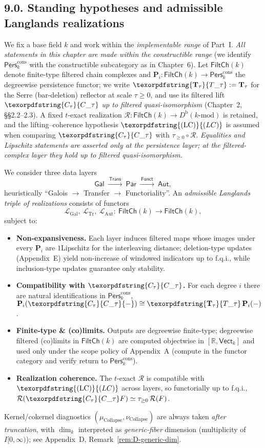 \documentclass[11pt]{article}
\DeclareRobustCommand{\hyp}{\nobreakdash-}
\newcommand{\Pers}{\mathsf{Pers}}
\newcommand{\Rfun}{\mathcal{R}}
\numberwithin{equation}{section}
\theoremstyle{definition}
\DeclareRobustCommand{\FiltCh}[1]{\mathsf{FiltCh}(#1)}
\DeclareRobustCommand{\Perskft}{\Pers^{\mathrm{cons}}_{k}}
\DeclareRobustCommand{\Ttau}{\texorpdfstring{\ensuremath{\mathbf{T}_{\tau}}}{T\_\tau}}
\DeclareRobustCommand{\Ctau}{\texorpdfstring{\ensuremath{C_{\tau}}}{C\_\tau}}
\DeclareRobustCommand{\LC}{\texorpdfstring{\ensuremath{\mathrm{(LC)}}}{(LC)}}
\begin{document}
\subsection*{9.0. Standing hypotheses and admissible Langlands realizations}
We fix a base field \(k\) and work within the \emph{implementable range} of Part~I.
\emph{All statements in this chapter are made within the constructible range}
(we identify \(\Perskft\) with the constructible subcategory as in Chapter~6).
Let \(\FiltCh{k}\) denote finite\hyp type filtered chain complexes and
\(\mathbf{P}_i:\FiltCh{k}\to\Perskft\) the degreewise persistence functor; we write
\(\Ttau:=\mathbf{T}_\tau\) for the Serre (bar\hyp deletion) reflector at scale \(\tau\ge 0\),
and use its filtered lift \(\Ctau\) \emph{up to filtered quasi\hyp isomorphism} (Chapter~2, §§2.2–2.3).
A fixed \(t\)\hyp exact realization \(\Rfun:\FiltCh{k}\to D^{\mathrm{b}}(k\text{-mod})\) is retained, and the lifting–coherence hypothesis \(\LC\) is assumed when comparing \(\Ctau\) with \(\tau_{\ge 0}\!\circ\!\Rfun\).
\emph{Equalities and Lipschitz statements are asserted only at the persistence layer; at the filtered\hyp complex layer they hold up to filtered quasi\hyp isomorphism.}

We consider three data layers
\[
\mathsf{Gal}\ \xrightarrow{\ \mathsf{Trans}\ }\ \mathsf{Par}\ \xrightarrow{\ \mathsf{Funct}\ }\ \mathsf{Aut},
\]
heuristically “Galois \(\to\) Transfer \(\to\) Functoriality”.
An \emph{admissible Langlands triple of realizations} consists of functors
\[
\mathcal{L}_{\mathrm{Gal}},\ \mathcal{L}_{\mathrm{Tr}},\ \mathcal{L}_{\mathrm{Aut}}:\ \FiltCh{k}\longrightarrow\FiltCh{k},
\]
subject to:
\begin{itemize}
  \item \textbf{Non\hyp expansiveness.} Each layer induces filtered maps whose images under every \(\mathbf{P}_i\) are \(1\)\nobreakdash Lipschitz for the interleaving distance; deletion\hyp type updates (Appendix~E) yield non\hyp increase of windowed indicators up to f.q.i., while inclusion\hyp type updates guarantee only stability.
  \item \textbf{Compatibility with \(\Ctau\).} For each degree \(i\) there are natural identifications in \(\Perskft\),
  \(\mathbf{P}_i(\Ctau{-})\cong \Ttau\,\mathbf{P}_i(-)\).
  \item \textbf{Finite\hyp type \& (co)limits.} Outputs are degreewise finite\hyp type; degreewise filtered (co)limits in \(\FiltCh{k}\) are computed objectwise in \([\mathbb{R},\mathsf{Vect}_k]\) and used only under the scope policy of Appendix~A (compute in the functor category and verify return to \(\Pers^{\mathrm{cons}}_k\)).
  \item \textbf{Realization coherence.} The \(t\)\hyp exact \(\Rfun\) is compatible with \(\LC\) across layers, so functorially up to f.q.i.,
  \(\Rfun(\Ctau F)\simeq \tau_{\ge 0}\,\Rfun(F)\).
\end{itemize}
Kernel/cokernel diagnostics \((\mu_{\mathrm{Collapse}},\nu_{\mathrm{Collapse}})\) are always taken \emph{after truncation}, with \(\dim_k\) interpreted as \emph{generic\hyp fiber} dimension (multiplicity of \(I[0,\infty)\)); see Appendix~D, Remark~\ref{rem:D-generic-dim}.
\end{document}
